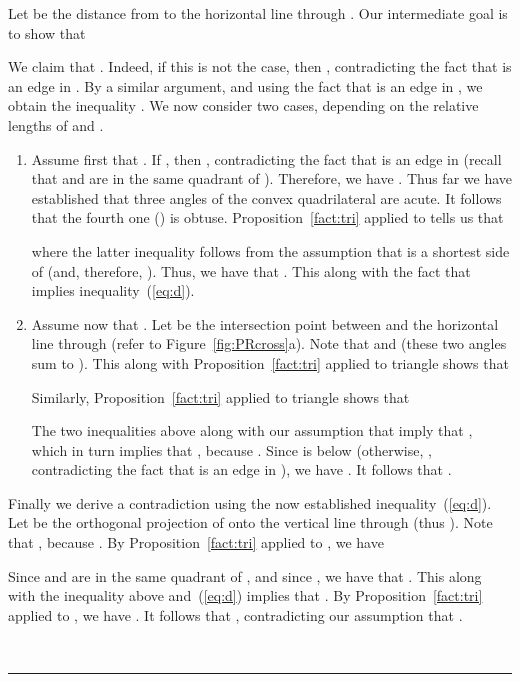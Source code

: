 \pdfoutput=1  \documentclass[11pt]{article}
\newcommand{\qed}{\rule{0.5em}{1.5ex}}
\newcommand{\fqed}{{\hfill~\qed}}
\newenvironment{proof}{{\noindent \bf Proof.}}
                      {{\hfill \fqed} \vspace{1em}}
\begin{document}
\begin{proof}
Let  be the distance from  to the horizontal line through .
Our intermediate goal is to show that

We claim that . Indeed, if this is not the case,
then , contradicting the fact that  is an
edge in . By a similar argument, and using the fact that
 is an edge in , we obtain the inequality
.
We now consider two cases, depending on the relative lengths of  and .

\begin{enumerate}

\item

Assume first that .
If , then , contradicting
the fact that  is an edge in  (recall that 
and  are in the same quadrant of ). Therefore, we have
.
Thus far we have established that three angles of the convex quadrilateral
 are acute. It follows that the fourth one () is obtuse.
Proposition~\ref{fact:tri}
applied to  tells us that

where the latter inequality follows from the assumption that  is a
shortest side of  (and, therefore, ).
Thus, we have that . This along with the fact that
 implies inequality~(\ref{eq:d}).

\item
Assume now that . Let  be the intersection
point between  and the horizontal line through 
(refer to Figure~\ref{fig:PRcross}a). Note that
 and 
(these two angles sum to ).
This along with
Proposition~\ref{fact:tri}
applied to triangle  shows that

Similarly,
Proposition~\ref{fact:tri}
applied to triangle  shows that

The two inequalities above along with our assumption that 
imply that , which in turn implies that ,
because . Since  is below  (otherwise, ,
contradicting the fact that  is an edge in ),
we have . It follows that . \end{enumerate}

Finally we derive a contradiction using the now established inequality~(\ref{eq:d}).
Let  be the orthogonal projection of  onto the vertical line through
 (thus ).
Note that , because .
By
Proposition~\ref{fact:tri}
applied to , we have

Since  and  are in the same quadrant of , and since
, we have that .
This along with the inequality above and~(\ref{eq:d}) implies that
. By
Proposition~\ref{fact:tri}
applied to ,
we have
. It
follows that , contradicting our assumption that
.
\end{proof}
\end{document}
